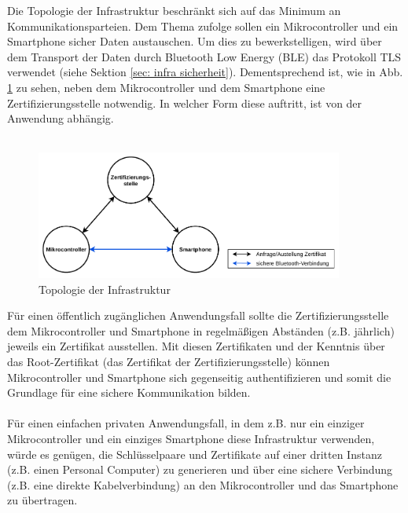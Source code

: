 Die Topologie der Infrastruktur beschränkt sich auf das Minimum an Kommunikationsparteien. Dem Thema zufolge sollen ein Mikrocontroller und ein Smartphone sicher Daten austauschen. Um dies zu bewerkstelligen, wird über dem Transport der Daten durch Bluetooth Low Energy (BLE) das Protokoll TLS verwendet (siehe Sektion \ref{sec: infra sicherheit}). Dementsprechend ist, wie in Abb. \ref{fig: infra topologie} zu sehen, neben dem Mikrocontroller und dem Smartphone eine Zertifizierungsstelle notwendig. In welcher Form diese auftritt, ist von der Anwendung abhängig.
\\\\

\begin{figure}[H]
    \centering
    \includegraphics[width=0.9\textwidth]{graphics/infra_topologie.pdf}
    \caption[Topologie der Infrastruktur]{Topologie der Infrastruktur}
    \label{fig: infra topologie}
\end{figure}

Für einen öffentlich zugänglichen Anwendungsfall sollte die Zertifizierungsstelle dem Mikrocontroller und Smartphone in regelmäßigen Abständen (z.B. jährlich) jeweils ein Zertifikat ausstellen. Mit diesen Zertifikaten und der Kenntnis über das Root-Zertifikat (das Zertifikat der Zertifizierungsstelle) können Mikrocontroller und Smartphone sich gegenseitig authentifizieren und somit die Grundlage für eine sichere Kommunikation bilden.
\\\\
Für einen einfachen privaten Anwendungsfall, in dem z.B. nur ein einziger Mikrocontroller und ein einziges Smartphone diese Infrastruktur verwenden, würde es genügen, die Schlüsselpaare und Zertifikate auf einer dritten Instanz (z.B. einen Personal Computer) zu generieren und über eine sichere Verbindung (z.B. eine direkte Kabelverbindung) an den Mikrocontroller und das Smartphone zu übertragen.
